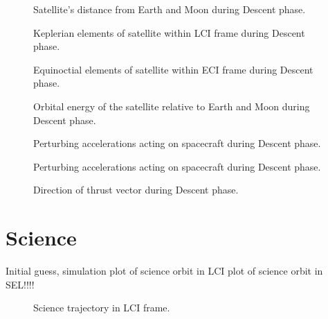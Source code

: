 \begin{figure}
\centering
%
\caption{Satellite's distance from Earth and Moon during Descent phase.}
\label{fig:Descent-dist}
\end{figure}

\begin{figure}
\centering
%
\caption{Keplerian elements of satellite within LCI frame during Descent phase.}
\label{fig:Descent-kep-lci}
\end{figure}

\begin{figure}
\centering
%
\caption{Equinoctial elements of satellite within ECI frame during Descent phase.}
\label{fig:Descent-mee}
\end{figure}

\begin{figure}
\centering
%
\caption{Orbital energy of the satellite relative to Earth and Moon during Descent phase.}
\label{fig:Descent-orbeng}
\end{figure}

\begin{figure}
\centering
%
\caption{Perturbing accelerations acting on spacecraft during Descent phase.}
\label{fig:Descent-pert}
\end{figure}

\begin{figure}
\centering
%
\caption{Perturbing accelerations acting on spacecraft during Descent phase.}
\label{fig:Descent-pert2}
\end{figure}

\begin{figure}
\centering
%
\caption{Direction of thrust vector during Descent phase.}
\label{fig:Descent-thrust}
\end{figure}


\clearpage

\section{Science}
Initial guess, simulation
plot of science orbit in LCI
plot of science orbit in SEL!!!! 

\begin{figure}
\centering
%
\caption{Science trajectory in LCI frame.}
\label{fig:Science-3D-lci}
\end{figure}

